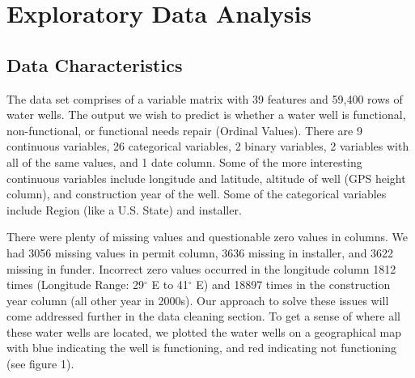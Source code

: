 \documentclass[10pt]{SelfArx} %
\begin{document}
\flushbottom %

\noindent \maketitle %


\tableofcontents %

\thispagestyle{empty} %


\section{Exploratory Data Analysis} %
\subsection{Data Characteristics}

The data set comprises of a variable matrix with 39 features and 59,400 rows of water wells. The output we wish to predict is whether a water well is functional, non-functional, or functional needs repair (Ordinal Values). There are 9 continuous variables, 26 categorical variables, 2 binary variables, 2 variables with all of the same values, and 1 date column. Some of the more interesting continuous variables include longitude and latitude, altitude of well (GPS height column), and construction year of the well. Some of the categorical variables include Region (like a U.S. State) and installer. 
\\[-1.5\baselineskip]
\break

There were plenty of missing values and questionable zero values in columns. We had 3056 missing values in permit column, 3636 missing in installer, and 3622 missing in funder. Incorrect zero values occurred in the longitude column 1812 times (Longitude Range: 29$^\circ$ E to 41$^\circ$ E) and 18897 times in the construction year column (all other year in 2000s). Our approach to solve these issues will come addressed further in the data cleaning section. To get a sense of where all these water wells are located, we plotted the water wells on a geographical map with blue indicating the well is functioning, and red indicating not functioning (see figure 1).
\end{document}
